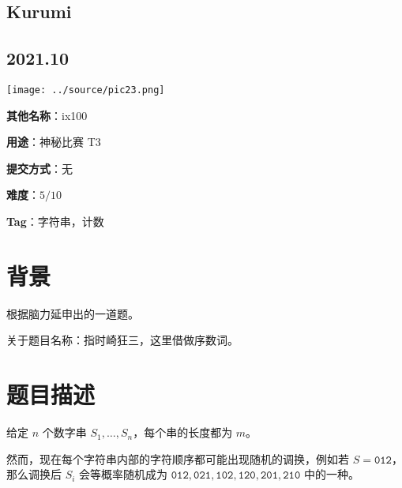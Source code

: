 \documentclass[a4paper,10pt]{article}
\begin{document}
\vspace*{\fill}
\begin{center}

\section{Kurumi}

\subsection*{2021.10}

\vspace{10pt}

\texttt{[image: ../source/pic23.png]}

\vspace{10pt}

\textbf{其他名称}：ix100

\vspace{10pt}

\textbf{用途}：神秘比赛 T3

\vspace{10pt}

\textbf{提交方式}：无

\vspace{10pt}

\textbf{难度}：$5/10$

\vspace{10pt}

\textbf{Tag}：字符串，计数

\end{center}
\vspace*{\fill}

\newpage

\section*{背景}

根据脑力延申出的一道题。

关于题目名称：指时崎狂三，这里借做序数词。

\section*{题目描述}

给定 $n$ 个数字串 $S_1,\ldots,S_n$，每个串的长度都为 $m$。

然而，现在每个字符串内部的字符顺序都可能出现随机的调换，例如若 $S=\texttt{012}$，那么调换后 $S_i$ 会等概率随机成为 $\texttt{012},\texttt{021},\texttt{102},\texttt{120},\texttt{201},\texttt{210}$ 中的一种。
\end{document}
